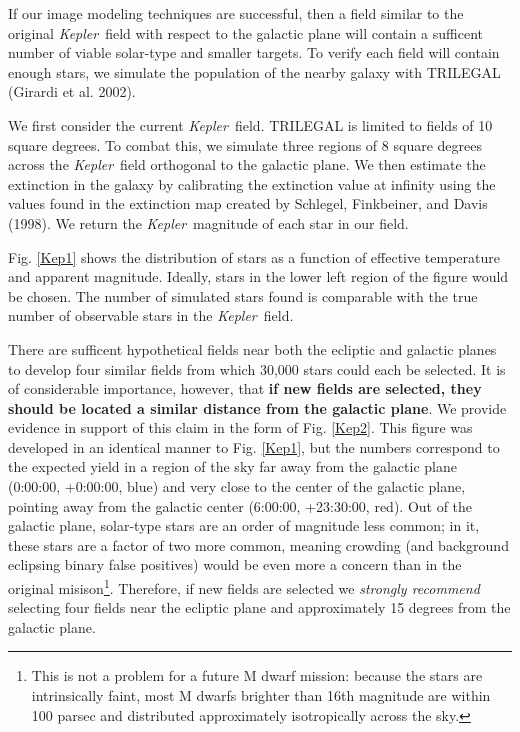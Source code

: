 \documentclass[12pt, preprint]{aastex}
\newcommand{\observatory}[1]{\textsl{#1}}
\newcommand{\kepler}{\observatory{Kepler}}
\newcommand{\Kepler}{\kepler}
\begin{document}
If our image modeling techniques are successful, then a field similar to the 
 original \Kepler\ field with respect to the galactic plane will contain 
 a sufficent number of viable solar-type and smaller targets. 
To verify each field will contain enough stars, we simulate the population 
 of the nearby galaxy with TRILEGAL (Girardi et al. 2002). 

We first consider the current \Kepler\ field. 
TRILEGAL is limited to fields of 10 square degrees. 
To combat this, we simulate three regions of 8 square degrees across the 
 \Kepler\ field orthogonal to the galactic plane. 
We then estimate the extinction in the galaxy by calibrating the extinction 
 value at infinity using the values found in the extinction map created by 
 Schlegel, Finkbeiner, and Davis (1998). 
We return the \Kepler\ magnitude of each star in our field.

Fig. \ref{Kep1} shows the distribution of stars as a function of effective 
 temperature and apparent magnitude. 
Ideally, stars in the lower left region of the figure would be chosen. 
The number of simulated stars found is comparable with the true number of 
 observable stars in the \Kepler\ field.

There are sufficent hypothetical fields near both the ecliptic and galactic 
 planes to develop four similar fields from which 30,000 stars could each 
 be selected. 
It is of considerable importance, however, that \textbf{if new fields are 
 selected, they should be located a similar distance from the galactic plane}. 
We provide evidence in support of this claim in the form of Fig. \ref{Kep2}. 
This figure was developed in an identical manner to Fig. \ref{Kep1}, but 
 the numbers correspond to the expected yield in a region of the sky far away
 from the galactic plane (0:00:00, +0:00:00, blue) and very close to the center
 of the galactic plane, pointing away from the galactic center (6:00:00, 
 +23:30:00, red). 
Out of the galactic plane, solar-type stars are an order of magnitude less 
 common; in it, these stars are a factor of two more common, meaning crowding
 (and background eclipsing binary false positives) would be even more a concern
 than in the original misison\footnote{This is not a problem for a future M 
 dwarf mission: because the stars are intrinsically faint, most M dwarfs 
 brighter than 16th magnitude are within 100 parsec and distributed 
 approximately isotropically across the sky.}.
Therefore, if new fields are selected we \emph{strongly recommend} selecting 
 four fields near the ecliptic plane and approximately 15 degrees from the 
 galactic plane. 
 
\end{document}
